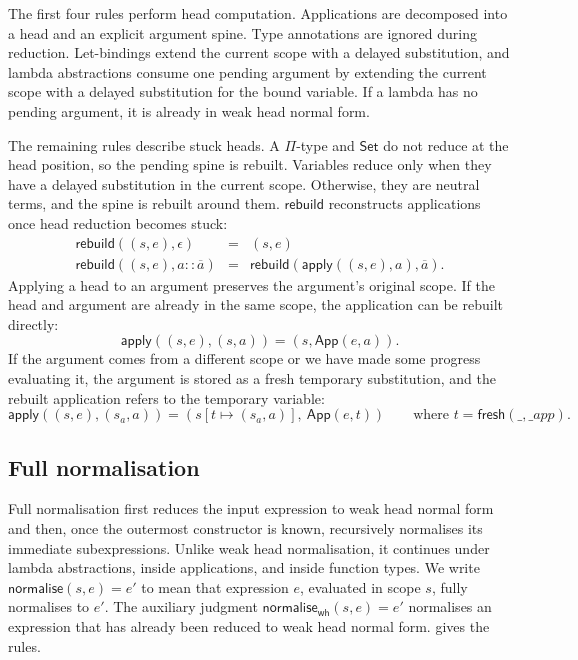 The first four rules perform head computation. Applications are decomposed into
a head and an explicit argument spine. Type annotations are ignored during
reduction. Let-bindings extend the current scope with a delayed substitution,
and lambda abstractions consume one pending argument by extending the current
scope with a delayed substitution for the bound variable. If a lambda has no
pending argument, it is already in weak head normal form.

The remaining rules describe stuck heads. A \(\Pi\)-type and \(\mathsf{Set}\)
do not reduce at the head position, so the pending spine is rebuilt. Variables
reduce only when they have a delayed substitution in the current scope.
Otherwise, they are neutral terms, and the spine is rebuilt around them.
\(\mathsf{rebuild}\) reconstructs applications once head reduction becomes
stuck:
\[
\begin{array}{rcl}
\mathsf{rebuild}((s,e), \epsilon)
&=&
(s,e)
\\[0.5em]
\mathsf{rebuild}((s,e), a :: \overline{a})
&=&
\mathsf{rebuild}(\mathsf{apply}((s,e),a),\overline{a}).
\end{array}
\]
Applying a head to an argument preserves the argument's original scope. If the
head and argument are already in the same scope, the application can be rebuilt
directly:
\[
\mathsf{apply}((s,e),(s,a)) = (s, \mathsf{App}(e, a)).
\]
If the argument comes from a different scope or we have made some progress
evaluating it, the argument is stored as a fresh temporary substitution, and the
rebuilt application refers to the temporary variable:
\[
\mathsf{apply}((s,e),(s_a,a))
=
(s[t \mapsto (s_a,a)],\ \mathsf{App}(e, t))
\qquad
\text{where } t = \mathsf{fresh}(\_, \_app).
\]

\subsection{Full normalisation}

Full normalisation first reduces the input expression to weak head normal form
and then, once the outermost constructor is known, recursively normalises its
immediate subexpressions. Unlike weak head normalisation, it continues under
lambda abstractions, inside applications, and inside function types. We write
\(\mathsf{normalise}(s,e) = e'\) to mean that expression \(e\), evaluated in
scope \(s\), fully normalises to \(e'\). The auxiliary judgment
\(\mathsf{normalise}_{\mathsf{wh}}(s,e) = e'\) normalises an expression that has
already been reduced to weak head normal form.  gives
the rules.

